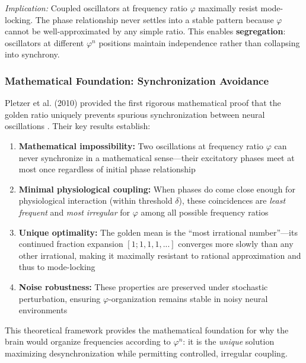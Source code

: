 \documentclass[11pt,a4paper]{article}
\newcommand{\phisym}{\varphi}
\begin{document}
\textit{Implication:} Coupled oscillators at frequency ratio $\phisym$ maximally resist mode-locking. The phase relationship never settles into a stable pattern because $\phisym$ cannot be well-approximated by any simple ratio. This enables \textbf{segregation}: oscillators at different $\phisym^n$ positions maintain independence rather than collapsing into synchrony.

\subsubsection{Mathematical Foundation: Synchronization Avoidance}

Pletzer et al. (2010) provided the first rigorous mathematical proof that the golden ratio uniquely prevents spurious synchronization between neural oscillations \parencite{pletzer2010golden}. Their key results establish:

\begin{enumerate}
    \item \textbf{Mathematical impossibility:} Two oscillations at frequency ratio $\phisym$ can never synchronize in a mathematical sense---their excitatory phases meet at most once regardless of initial phase relationship

    \item \textbf{Minimal physiological coupling:} When phases do come close enough for physiological interaction (within threshold $\delta$), these coincidences are \textit{least frequent} and \textit{most irregular} for $\phisym$ among all possible frequency ratios

    \item \textbf{Unique optimality:} The golden mean is the ``most irrational number''---its continued fraction expansion $[1; 1, 1, 1, ...]$ converges more slowly than any other irrational, making it maximally resistant to rational approximation and thus to mode-locking

    \item \textbf{Noise robustness:} These properties are preserved under stochastic perturbation, ensuring $\phisym$-organization remains stable in noisy neural environments
\end{enumerate}

This theoretical framework provides the mathematical foundation for why the brain would organize frequencies according to $\phisym^n$: it is the \textit{unique} solution maximizing desynchronization while permitting controlled, irregular coupling.
\end{document}
